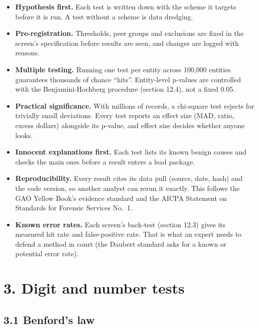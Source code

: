 \documentclass[letterpaper,11pt]{article}
\providecommand{\tightlist}{\setlength{\itemsep}{0pt}\setlength{\parskip}{0pt}}
\begin{document}
\begin{itemize}
\tightlist
\item
  \textbf{Hypothesis first.} Each test is written down with the scheme
  it targets before it is run. A test without a scheme is data dredging.
\item
  \textbf{Pre-registration.} Thresholds, peer groups and exclusions are
  fixed in the screen's specification before results are seen, and
  changes are logged with reasons.
\item
  \textbf{Multiple testing.} Running one test per entity across 100,000
  entities guarantees thousands of chance ``hits''. Entity-level
  p-values are controlled with the Benjamini-Hochberg procedure (section
  12.4), not a fixed 0.05.
\item
  \textbf{Practical significance.} With millions of records, a
  chi-square test rejects for trivially small deviations. Every test
  reports an effect size (MAD, ratio, excess dollars) alongside its
  p-value, and effect size decides whether anyone looks.
\item
  \textbf{Innocent explanations first.} Each test lists its known benign
  causes and checks the main ones before a result enters a lead package.
\item
  \textbf{Reproducibility.} Every result cites its data pull (source,
  date, hash) and the code version, so another analyst can rerun it
  exactly. This follows the GAO Yellow Book's evidence standard and the
  AICPA Statement on Standards for Forensic Services No.~1.
\item
  \textbf{Known error rates.} Each screen's back-test (section 12.3)
  gives its measured hit rate and false-positive rate. That is what an
  expert needs to defend a method in court (the Daubert standard asks
  for a known or potential error rate).
\end{itemize}

\hypertarget{digit-and-number-tests}{%
\section*{3. Digit and number tests}\label{digit-and-number-tests}}

\hypertarget{benfords-law}{%
\subsection*{3.1 Benford's law}\label{benfords-law}}
\end{document}
